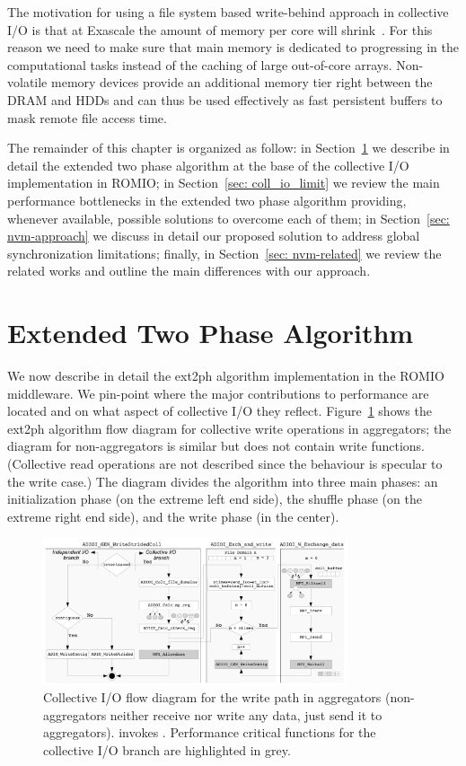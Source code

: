The motivation for using a file system based write-behind approach in collective I/O is that at Exascale the amount of memory per core will shrink~\cite{ASCAC2010}. For this reason we need to make 
sure that main memory is dedicated to progressing in the computational tasks instead of the caching of large out-of-core arrays. Non-volatile memory devices provide an additional memory tier right 
between the DRAM and HDDs and can thus be used effectively as fast persistent buffers to mask remote file access time.

The remainder of this chapter is organized as follow: in Section~\ref{sec: ext2ph} we describe in detail the extended two phase algorithm at the base of the collective I/O implementation in ROMIO;
in Section~\ref{sec: coll_io_limit} we review the main performance bottlenecks in the extended two phase algorithm providing, whenever available, possible solutions to overcome each of them; 
in Section~\ref{sec: nvm-approach} we discuss in detail our proposed solution to address global synchronization limitations; finally, in Section~\ref{sec: nvm-related} we review the related works 
and outline the main differences with our approach.

\section{Extended Two Phase Algorithm} \label{sec: ext2ph}
We now describe in detail the ext2ph algorithm implementation in the ROMIO middleware. We pin-point where the major contributions to performance are located and on what aspect of collective I/O they
reflect. Figure~\ref{figure: coll_io_impl} shows the ext2ph algorithm flow diagram for collective write operations in aggregators; the diagram for non-aggregators is similar but does not contain write 
functions. (Collective read operations are not described since the behaviour is specular to the write case.) The diagram divides the algorithm into three main phases: an initialization phase (on the 
extreme left end side), the shuffle phase (on the extreme right end side), and the write phase (in the center).

\begin{figure}[H]
  \centering
  \includegraphics[angle=90, width=0.8\textwidth]{figures/ext2ph_t}
  \caption{Collective I/O flow diagram for the write path in aggregators (non-aggregators neither receive nor write any data, just send it to aggregators).  
  invokes . Performance critical functions for the collective I/O branch are highlighted in grey.}
  \label{figure: coll_io_impl}
\end{figure}

